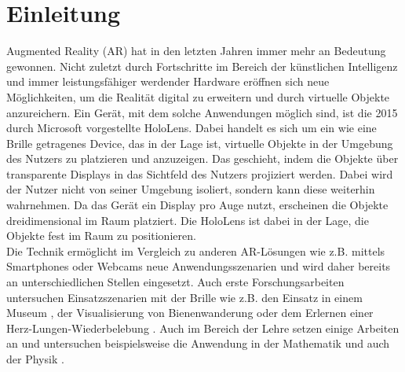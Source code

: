 \section{Einleitung}
\label{sec-1}
Augmented Reality (AR) hat in den letzten Jahren immer mehr an Bedeutung gewonnen. Nicht zuletzt durch Fortschritte im Bereich der künstlichen Intelligenz und immer leistungsfähiger werdender Hardware eröffnen sich neue Möglichkeiten, um die Realität digital zu erweitern und durch virtuelle Objekte anzureichern. Ein Gerät, mit dem solche Anwendungen möglich sind, ist die 2015 durch Microsoft vorgestellte HoloLens. Dabei handelt es sich um ein wie eine Brille getragenes Device, das in der Lage ist, virtuelle Objekte in der Umgebung des Nutzers zu platzieren und anzuzeigen. Das geschieht, indem die Objekte über transparente Displays in das Sichtfeld des Nutzers projiziert werden. Dabei wird der Nutzer nicht von seiner Umgebung isoliert, sondern kann diese weiterhin wahrnehmen. Da das Gerät ein Display pro Auge nutzt, erscheinen die Objekte dreidimensional im Raum platziert. Die HoloLens ist dabei in der Lage, die Objekte fest im Raum zu positionieren.\\
\noindent\hspace*{5mm}
Die Technik ermöglicht im Vergleich zu anderen AR-Lösungen wie z.B. mittels Smartphones oder Webcams neue Anwendungsszenarien und wird daher bereits an unterschiedlichen Stellen eingesetzt. Auch erste Forschungsarbeiten untersuchen Einsatzszenarien mit der Brille wie z.B. den Einsatz in einem Museum \cite{Pollalis17}, der Visualisierung von Bienenwanderung \cite{Nguyen17} oder dem Erlernen einer Herz-Lungen-Wiederbelebung \cite{Javaheri18A}. Auch im Bereich der Lehre setzen einige Arbeiten an und untersuchen beispielsweise die Anwendung in der Mathematik \cite{Khan18} und auch der Physik \cite{Amiraslanov18, Strzys18, Javaheri18}.\\

